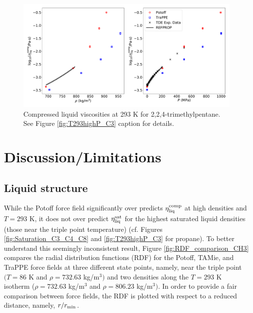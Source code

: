 \documentclass[preprint,review,12pt]{elsarticle}
\begin{document}
	\begin{figure}[htb!]
		\centering
		\includegraphics[width=6.4in]{compare_REFPROP_T293highP_IC8H18.pdf}
		\caption{Compressed liquid viscosities at 293 K for 2,2,4-trimethylpentane. See Figure \ref{fig:T293highP_C3} caption for details.}
		\label{fig:T293highP_IC8}
	\end{figure} 
	
	\section{Discussion/Limitations} \label{Discussion/Limitations}
	
	\subsection{Liquid structure} \label{sec:RDF}
	
	While the Potoff force field significantly over predicts $\eta_{\rm liq}^{\rm comp}$ at high densities and $T= 293$ K, it does not over predict $\eta_{\rm liq}^{\rm sat}$ for the highest saturated liquid densities (those near the triple point temperature) (cf. Figures \ref{fig:Saturation_C3_C4_C8} and \ref{fig:T293highP_C3} for propane). To better understand this seemingly inconsistent result, Figure \ref{fig:RDF_comparison_CH3} compares the radial distribution functions (RDF) for the Potoff, TAMie, and TraPPE force fields at three different state points, namely, near the triple point $(T=86$ K and $\rho = 732.63$ kg/m$^3)$ and two densities along the $T = 293$ K isotherm ($\rho = 732.63$ kg/m$^3$ and $\rho = 806.23$ kg/m$^3)$. In order to provide a fair comparison between force fields, the RDF is plotted with respect to a reduced distance, namely, $r/r_{\rm min}$.
	
	
\end{document}
